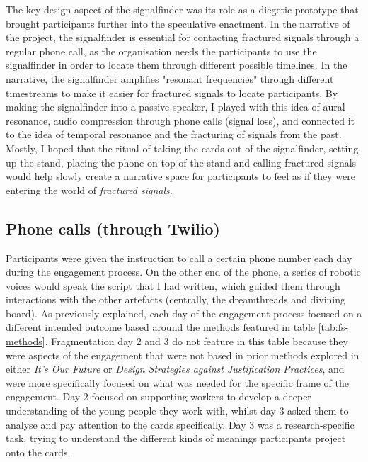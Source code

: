 The key design aspect of the signalfinder was its role as a diegetic prototype that brought participants further into the speculative enactment. In the narrative of the project, the signalfinder is essential for contacting fractured signals through a regular phone call, as the organisation needs the participants to use the signalfinder in order to locate them through different possible timelines. In the narrative, the signalfinder amplifies "resonant frequencies" through different timestreams to make it easier for fractured signals to locate participants. By making the signalfinder into a passive speaker, I played with this idea of aural resonance, audio compression through phone calls (signal loss), and connected it to the idea of temporal resonance and the fracturing of signals from the past. Mostly, I hoped that the ritual of taking the cards out of the signalfinder, setting up the stand, placing the phone on top of the stand and calling fractured signals would help slowly create a narrative space for participants to feel as if they were entering the world of \textit{fractured signals}. 



\subsection{Phone calls (through Twilio)}

Participants were given the instruction to call a certain phone number each day during the engagement process. On the other end of the phone, a series of robotic voices would speak the script that I had written, which guided them through interactions with the other artefacts (centrally, the dreamthreads and divining board). As previously explained, each day of the engagement process focused on a different intended outcome based around the methods featured in table \ref{tab:fs-methods}. Fragmentation day 2 and 3 do not feature in this table because they were aspects of the engagement that were not based in prior methods explored in either \textit{It's Our Future} or \textit{Design Strategies against Justification Practices}, and were more specifically focused on what was needed for the specific frame of the engagement. Day 2 focused on supporting workers to develop a deeper understanding of the young people they work with, whilst day 3 asked them to analyse and pay attention to the cards specifically. Day 3 was a research-specific task, trying to understand the different kinds of meanings participants project onto the cards.  

